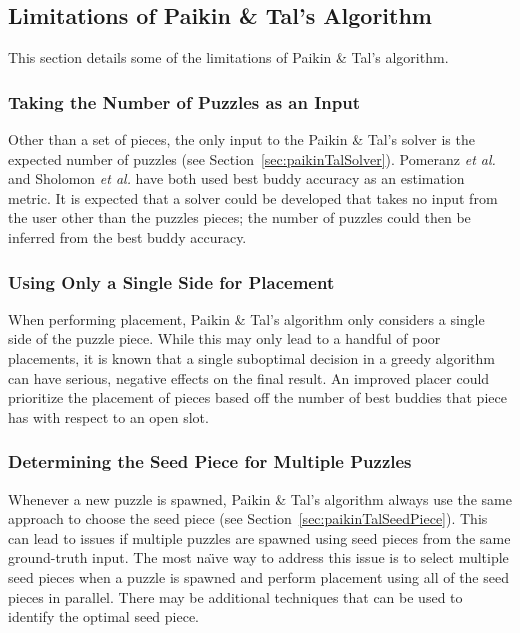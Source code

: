 \documentclass{report}
\begin{document}
\subsection{Limitations of Paikin \& Tal's Algorithm}\label{sec:paikinTalLimitations}

This section details some of the limitations of Paikin \& Tal's algorithm.  

\subsubsection{Taking the Number of Puzzles as an Input}\label{sec:limitationNumberPuzzles}

Other than a set of pieces, the only input to the Paikin \& Tal's solver is the expected number of puzzles (see Section~\ref{sec:paikinTalSolver}). Pomeranz \textit{et al.} and Sholomon \textit{et al.} have both used best buddy accuracy as an estimation metric.  It is expected that a solver could be developed that takes no input from the user other than the puzzles pieces; the number of puzzles could then be inferred from the best buddy accuracy.


\subsubsection{Using Only a Single Side for Placement}\label{sec:limitationPlacementSingleSide}

When performing placement, Paikin \& Tal's algorithm only considers a single side of the puzzle piece.  While this may only lead to a handful of poor placements, it is known that a single suboptimal decision in a greedy algorithm can have serious, negative effects on the final result.  An improved placer could prioritize the placement of pieces based off the number of best buddies that piece has with respect to an open slot.

\subsubsection{Determining the Seed Piece for Multiple Puzzles}\label{sec:limitationSeedPieceMultiplePuzzles}

Whenever a new puzzle is spawned, Paikin \& Tal's algorithm always use the same approach to choose the seed piece (see Section~\ref{sec:paikinTalSeedPiece}).  This can lead to issues if multiple puzzles are spawned using seed pieces from the same ground-truth input.  The most na\"{\i}ve way to address this issue is to select multiple seed pieces when a puzzle is spawned and perform placement using all of the seed pieces in parallel.  There may be additional techniques that can be used to identify the optimal seed piece.
\end{document}
